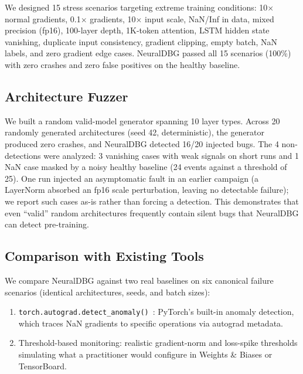 \documentclass[11pt]{article}
\begin{document}
We designed 15 stress scenarios targeting extreme training conditions: 10$\times$ normal gradients, 0.1$\times$ gradients, 10$\times$ input scale, NaN/Inf in data, mixed precision (fp16), 100-layer depth, 1K-token attention, LSTM hidden state vanishing, duplicate input consistency, gradient clipping, empty batch, NaN labels, and zero gradient edge cases. NeuralDBG passed all 15 scenarios (100\%) with zero crashes and zero false positives on the healthy baseline.

\subsection{Architecture Fuzzer}

We built a random valid-model generator spanning 10 layer types. Across 20 randomly generated architectures (seed 42, deterministic), the generator produced zero crashes, and NeuralDBG detected 16/20 injected bugs. The 4 non-detections were analyzed: 3 vanishing cases with weak signals on short runs and 1 NaN case masked by a noisy healthy baseline (24 events against a threshold of 25). One run injected an asymptomatic fault in an earlier campaign (a LayerNorm absorbed an fp16 scale perturbation, leaving no detectable failure); we report such cases as-is rather than forcing a detection. This demonstrates that even ``valid'' random architectures frequently contain silent bugs that NeuralDBG can detect pre-training.

\subsection{Comparison with Existing Tools}

We compare NeuralDBG against two real baselines on six canonical failure scenarios (identical architectures, seeds, and batch sizes):

\begin{enumerate}
    \item \texttt{torch.autograd.detect\_anomaly()}~\cite{paszke2019pytorch}: PyTorch's built-in anomaly detection, which traces NaN gradients to specific operations via autograd metadata.
    \item Threshold-based monitoring: realistic gradient-norm and loss-spike thresholds simulating what a practitioner would configure in Weights \& Biases or TensorBoard.
\end{enumerate}
\end{document}
